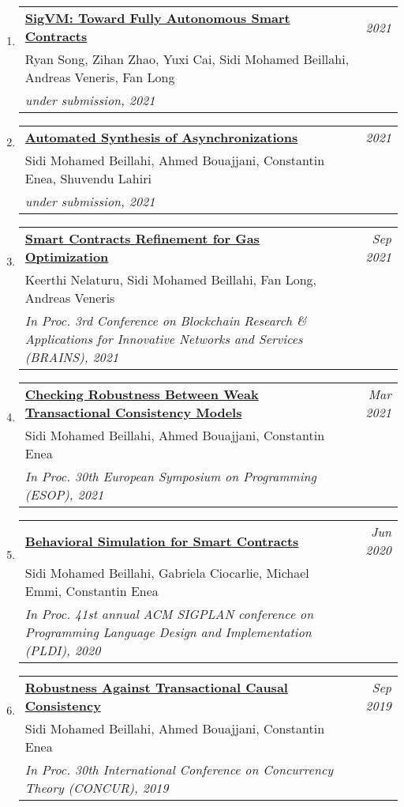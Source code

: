 \documentclass[10pt]{article}
\makeatletter
\newcommand{\lbar}[1]{{\color{#1}\ding{118}}\hspace*{2pt}}
\newenvironment{benumerate}[2]{
    \let\oldItem\item
    \def\item{\addtocounter{enumi}{-2}\oldItem}
    \begin{enumerate}[#2] \itemsep3pt
    \setcounter{enumi}{#1}
    \addtocounter{enumi}{1}}
  {\end{enumerate}}
\newenvironment{publication}[5]
{ \item
  \begin{tabular*}{7.5in}{p{6.3in}@{\extracolsep{\fill}}r}
    \href{#1}{\textbf{#2}} & \textit{#3}\\ #4 &\\ \textit{#5}&\\
  \end{tabular*}
} {}
\newenvironment{region}[3]{%
  \vspace*{0.5ex}
  {\scalebox{1.4}{\textbf{#1}}}
  \begin{benumerate}{#3}{\color{RoyalBlue}#2}}
  {\end{benumerate}\vspace{0.8ex}}
\makeatother
\begin{document}
\begin{region} {\lbar{purple}Conference Publications}{{C}1}{9}

  
  \begin{publication} {https://beillahi.github.io}
		{SigVM: Toward Fully Autonomous Smart Contracts}
		{2021} {Ryan Song, Zihan Zhao, Yuxi Cai, Sidi Mohamed Beillahi, Andreas Veneris, Fan Long}
		{under submission, 2021}
  \end{publication}

  \begin{publication} {https://beillahi.github.io/papers/asynchrony.pdf}
		{Automated Synthesis of Asynchronizations}
		{2021} {Sidi Mohamed Beillahi, Ahmed Bouajjani, Constantin Enea, Shuvendu Lahiri}
		{under submission, 2021}
  \end{publication}

  \begin{publication} {https://beillahi.github.io/papers/BRAINS21.pdf}
		{Smart Contracts Refinement for Gas Optimization}
		{Sep 2021} {Keerthi Nelaturu, Sidi Mohamed Beillahi, Fan Long, Andreas Veneris}
		{In Proc. 3rd Conference on Blockchain Research \& Applications for Innovative Networks and Services (BRAINS), 2021}
  \end{publication}

  \begin{publication} {https://beillahi.github.io/papers/ESOP21.pdf}
		{Checking Robustness Between Weak Transactional Consistency Models}
		{Mar 2021} {Sidi Mohamed Beillahi, Ahmed Bouajjani, Constantin Enea} 
		{In Proc. 30th European Symposium on Programming (ESOP), 2021} 
  \end{publication}

	\begin{publication} {https://beillahi.github.io/papers/PLDI20.pdf}
		{Behavioral Simulation for Smart Contracts}
		{Jun 2020} {Sidi Mohamed Beillahi, Gabriela Ciocarlie, Michael Emmi, Constantin Enea}
		{In Proc. 41st annual ACM SIGPLAN conference on Programming Language Design and Implementation (PLDI), 2020}
  \end{publication}

	\begin{publication} {https://beillahi.github.io/papers/CONCUR19.pdf}
		{Robustness Against Transactional Causal Consistency}
		{Sep 2019} {Sidi Mohamed Beillahi, Ahmed Bouajjani, Constantin Enea}
    {In Proc. 30th International Conference on Concurrency Theory (CONCUR), 2019}
  \end{publication}


\end{region}
\end{document}
